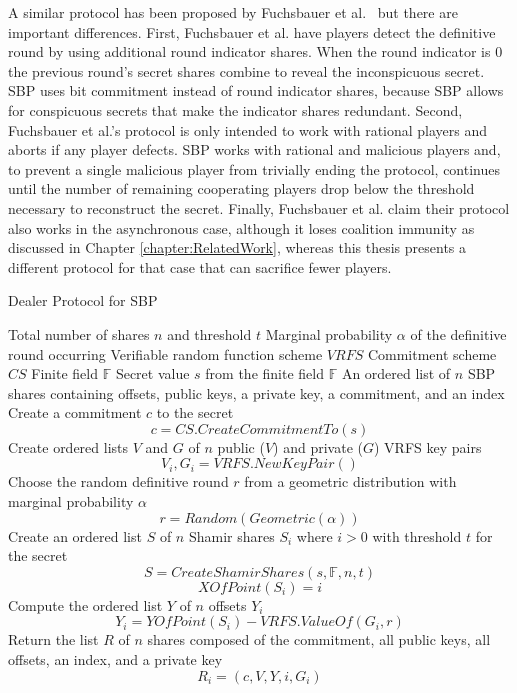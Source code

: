 \documentclass{dalcsthesis}
\begin{document}
A similar protocol has been proposed by Fuchsbauer et al.~\cite{fuch10} but there are important differences. First, Fuchsbauer et al. have players detect the definitive round by using additional round indicator shares. When the round indicator is 0 the previous round's secret shares combine to reveal the inconspicuous secret. SBP uses bit commitment instead of round indicator shares, because SBP allows for conspicuous secrets that make the indicator shares redundant. Second, Fuchsbauer et al.'s protocol is only intended to work with rational players and aborts if any player defects. SBP works with rational and malicious players and, to prevent a single malicious player from trivially ending the protocol, continues until the number of remaining cooperating players drop below the threshold necessary to reconstruct the secret. Finally, Fuchsbauer et al. claim their protocol also works in the asynchronous case, although it loses coalition immunity as discussed in Chapter \ref{chapter:RelatedWork}, whereas this thesis presents a different protocol for that case that can sacrifice fewer players.

\begin{algorithm}
  \caption{Dealer Protocol for SBP}
  \label{alg:SBP:Dealer}
  \begin{algorithmic}
    \INPUT Total number of shares $n$ and threshold $t$
    \INPUT Marginal probability $\alpha$ of the definitive round occurring
    \INPUT Verifiable random function scheme $VRFS$
    \INPUT Commitment scheme $CS$
    \INPUT Finite field $\mathbb{F}$
    \INPUT Secret value $s$ from the finite field $\mathbb{F}$
    \OUTPUT An ordered list of $n$ SBP shares containing offsets, public keys, a private key, a commitment, and an index
    \STATE Create a commitment $c$ to the secret
    	$$c = CS.CreateCommitmentTo(s)$$
    \STATE Create ordered lists $V$ and $G$ of $n$ public ($V$) and private ($G$) VRFS key pairs
    	$$V_i, G_i = VRFS.NewKeyPair()$$
    \STATE Choose the random definitive round $r$ from a geometric distribution with marginal probability $\alpha$
    	$$r = Random(Geometric(\alpha))$$
    \STATE Create an ordered list $S$ of $n$ Shamir shares $S_i$ where $i > 0$ with threshold $t$ for the secret
    	$$S = CreateShamirShares(s, \mathbb{F}, n, t)$$
    	$$XOfPoint(S_i) = i$$
    \STATE Compute the ordered list $Y$ of $n$ offsets $Y_i$
    	$$Y_i = YOfPoint(S_i) - VRFS.ValueOf(G_i, r)$$
    \STATE Return the list $R$ of $n$ shares composed of the commitment, all public keys, all offsets, an index, and a private key
    	$$R_i = (c, V, Y, i, G_i)$$
  \end{algorithmic}
\end{algorithm}
\end{document}
